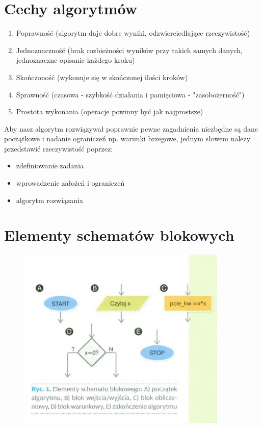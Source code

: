 \documentclass[a4paper,11pt]{article}
\begin{document}
\section{Cechy algorytmów}
\begin{enumerate} 
\item Poprawność (algorytm daje dobre wyniki, odzwierciedlające rzeczywistość) 
\item Jednoznaczność (brak rozbieżności wyników przy takich samych danych, 
jednoznaczne opisanie każdego kroku) 
\item Skończoność (wykonuje się w skończonej ilości kroków) 
\item Sprawność (czasowa - szybkość działania i pamięciowa - "zasobożerność") 
\item Prostota wykonania (operacje powinny być jak najprostsze) 
\end{enumerate}
Aby nasz algorytm rozwiązywał poprawnie pewne zagadnienia niezbędne są 
dane początkowe i nadanie ograniczeń np. warunki brzegowe, jednym słowem 
należy przedstawić rzeczywistość poprzez:
\begin{itemize}
\item zdefiniowanie zadania 
\item wprowadzenie założeń i ograniczeń 
\item algorytm rozwiązania
\end{itemize}

\section{Elementy schematów blokowych}
\begin{figure}[ht]
\centering
\includegraphics[width=10cm]{rys1}
\end{figure}
\end{document}
